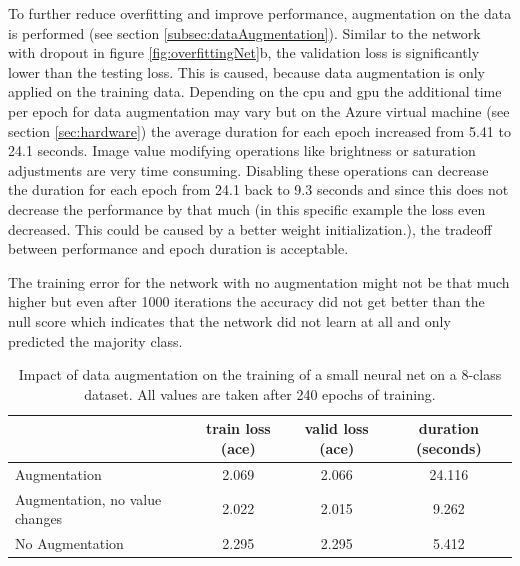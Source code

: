 	To further reduce overfitting and improve performance, augmentation on the data is performed {(see section \ref{subsec:dataAugmentation})}. Similar to the network with dropout in figure \ref{fig:overfittingNet}b, the validation loss is significantly lower than the testing loss. This is caused, because data augmentation is only applied on the training data. Depending on the \gls{cpu} and \gls{gpu} the additional time per epoch for data augmentation may vary but on the Azure virtual machine {(see section \ref{sec:hardware})} the average duration for each epoch increased from 5.41 to 24.1 seconds. Image value modifying operations like brightness or saturation adjustments are very time consuming. Disabling these operations can decrease the duration for each epoch from 24.1 back to 9.3 seconds and since this does not decrease the performance by that much {(in this specific example the loss even decreased. This could be caused by a better weight initialization.)}, the tradeoff between performance and epoch duration is acceptable.
	
	The training error for the network with no augmentation might not be that much higher but even after 1000 iterations the accuracy did not get better than the null score which indicates that the network did not learn at all and only predicted the majority class.
	
	\begin{table}[htbp]
		\centering
		\caption{Impact of data augmentation on the training of a small neural net on a 8-class dataset. All values are taken after 240 epochs of training.}
		\label{tab:result_augmentation}
		\begin{tabular}{lccc}
			\hline
			\multicolumn{1}{c}{} 				& train loss {(\gls{ace})}  & valid loss {(\gls{ace})}  & duration {(seconds)} \\ \hline
			Augmentation    				& 2.069	 	& 2.066		& 24.116 			\\ 
			Augmentation, no value changes  & 2.022		& 2.015     & 9.262
			    			\\ 
			No Augmentation                		& 2.295	& 2.295 	& 5.412		        \\ \bottomrule
		\end{tabular}
	\end{table}

